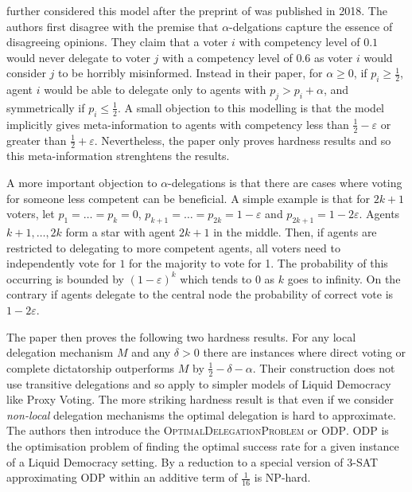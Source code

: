 \documentclass[11pt,a4paper, titlepage]{article}
\theoremstyle{definition}
\begin{document}
\citeauthor{caragiannis2019contribution} further considered this model after the preprint of \citet{kahng2021liquid} was published in 2018.
The authors first disagree with the premise that $\alpha$-delgations capture the essence of disagreeing opinions.
They claim that a voter $i$ with competency level of $0.1$ would never delegate to voter $j$ with a competency level of $0.6$ as voter $i$ would consider $j$ to be horribly misinformed.
Instead in their paper, for $\alpha \geq 0$, if $p_i \geq \frac{1}{2}$, agent $i$ would be able to delegate only to agents with $p_j > p_i + \alpha$, and symmetrically if $p_i \leq \frac{1}{2}$.
A small objection to this modelling is that the model implicitly gives meta-information to agents with competency less than $\frac{1}{2} - \varepsilon$ or greater than $\frac{1}{2} + \varepsilon$. Nevertheless, the paper only proves hardness results and so this meta-information strenghtens the results.

A more important objection to $\alpha$-delegations is that there are cases where voting for someone less competent can be beneficial.
A simple example is that for $2k + 1$ voters, let $p_1 = \ldots = p_k = 0$, $p_{k+1} = \ldots = p_{2k} = 1 - \varepsilon$ and $p_{2k+1} = 1 - 2\varepsilon$.
Agents $k+1, \ldots, 2k$ form a star with agent $2k+1$ in the middle.
Then, if agents are restricted to delegating to more competent agents, all voters need to independently vote for $1$ for the majority to vote for 1.
The probability of this occurring is bounded by $(1 - \varepsilon)^k$ which tends to 0 as $k$ goes to infinity.
On the contrary if agents delegate to the central node the probability of correct vote is $1 - 2\varepsilon$.

The paper then proves the following two hardness results.
For any local delegation mechanism $M$ and any $\delta > 0$ there are instances where direct voting or complete dictatorship outperforms $M$ by $\frac{1}{2} - \delta - \alpha$.
Their construction does not use transitive delegations and so apply to simpler models of Liquid Democracy like Proxy Voting.
The more striking hardness result is that even if we consider \emph{non-local} delegation mechanisms the optimal delegation is hard to approximate.
The authors then introduce the \textsc{OptimalDelegationProblem} or \textsc{ODP}.
\textsc{ODP} is the optimisation problem of finding the optimal success rate for a given instance of a Liquid Democracy setting.
By a reduction to a special version of \textsc{3-SAT} approximating \textsc{ODP} within an additive term of $\frac{1}{16}$ is NP-hard.
\end{document}
